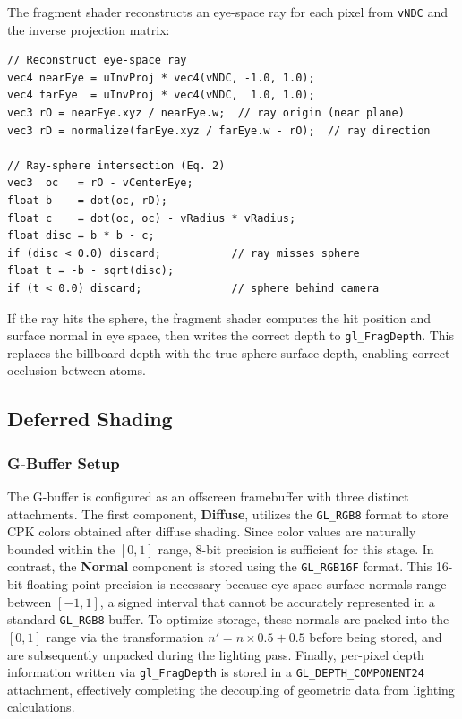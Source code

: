\documentclass[12pt, a4paper]{article}
\begin{document}
The fragment shader reconstructs an eye-space ray for each pixel from \texttt{vNDC} and the inverse projection matrix:

\begin{lstlisting}[style=glslstyle, caption={eye-space ray reconstruction and intersection (quadric.frag) }]
// Reconstruct eye-space ray
vec4 nearEye = uInvProj * vec4(vNDC, -1.0, 1.0);
vec4 farEye  = uInvProj * vec4(vNDC,  1.0, 1.0);
vec3 rO = nearEye.xyz / nearEye.w;  // ray origin (near plane)
vec3 rD = normalize(farEye.xyz / farEye.w - rO);  // ray direction

// Ray-sphere intersection (Eq. 2)
vec3  oc   = rO - vCenterEye;
float b    = dot(oc, rD);
float c    = dot(oc, oc) - vRadius * vRadius;
float disc = b * b - c;
if (disc < 0.0) discard;           // ray misses sphere
float t = -b - sqrt(disc);
if (t < 0.0) discard;              // sphere behind camera
\end{lstlisting}

If the ray hits the sphere, the fragment shader computes the hit position and surface normal in eye space, then writes the correct depth to \texttt{gl\_FragDepth}. This replaces the billboard depth with the true sphere surface depth, enabling correct occlusion between atoms.

\subsection{Deferred Shading}

\subsubsection{G-Buffer Setup}
The G-buffer is configured as an offscreen framebuffer with three distinct attachments. The first component, \textbf{Diffuse}, utilizes the \texttt{GL\_RGB8} format to store CPK colors obtained after diffuse shading. Since color values are naturally bounded within the $[0, 1]$ range, 8-bit precision is sufficient for this stage. In contrast, the \textbf{Normal} component is stored using the \texttt{GL\_RGB16F} format. This 16-bit floating-point precision is necessary because eye-space surface normals range between $[-1, 1]$, a signed interval that cannot be accurately represented in a standard \texttt{GL\_RGB8} buffer. To optimize storage, these normals are packed into the $[0, 1]$ range via the transformation $n' = n \times 0.5 + 0.5$ before being stored, and are subsequently unpacked during the lighting pass. Finally, per-pixel depth information written via \texttt{gl\_FragDepth} is stored in a \texttt{GL\_DEPTH\_COMPONENT24} attachment, effectively completing the decoupling of geometric data from lighting calculations.
\end{document}

